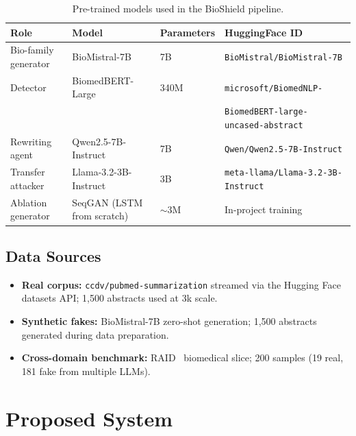 \documentclass[12pt,a4paper]{article}
\begin{document}
\begin{table}[H]
\centering
\caption{Pre-trained models used in the BioShield pipeline.}
\label{tab:models}
\renewcommand{\arraystretch}{1.25}
\begin{tabular}{@{}llll@{}}
\toprule
\textbf{Role}         & \textbf{Model}          & \textbf{Parameters} & \textbf{HuggingFace ID} \\
\midrule
Bio-family generator  & BioMistral-7B           & 7B                  & \texttt{BioMistral/BioMistral-7B} \\
Detector              & BiomedBERT-Large        & 340M                & \texttt{microsoft/BiomedNLP-} \\
                      &                         &                     & \texttt{BiomedBERT-large-uncased-abstract} \\
Rewriting agent       & Qwen2.5-7B-Instruct     & 7B                  & \texttt{Qwen/Qwen2.5-7B-Instruct} \\
Transfer attacker     & Llama-3.2-3B-Instruct   & 3B                  & \texttt{meta-llama/Llama-3.2-3B-Instruct} \\
Ablation generator    & SeqGAN (LSTM from scratch) & $\sim$3M           & In-project training \\
\bottomrule
\end{tabular}
\end{table}

\subsection{Data Sources}

\begin{itemize}
    \item \textbf{Real corpus:} \texttt{ccdv/pubmed-summarization} streamed
          via the Hugging Face datasets API; 1,500 abstracts used at 3k scale.
    \item \textbf{Synthetic fakes:} BioMistral-7B zero-shot generation;
          1,500 abstracts generated during data preparation.
    \item \textbf{Cross-domain benchmark:} RAID~\cite{dugan2024raid}
          biomedical slice; 200 samples (19 real, 181 fake from multiple LLMs).
\end{itemize}

\newpage
\section{Proposed System}
\label{sec:proposed}
\end{document}
